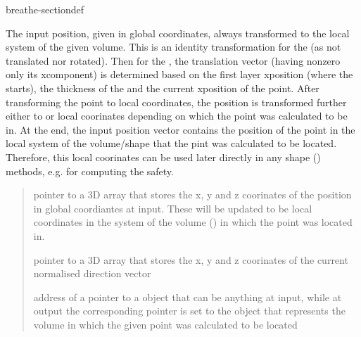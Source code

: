 \documentclass[letterpaper,10pt,english]{sphinxmanual}
\begin{document}
\begin{fulllineitems}
\begin{sphinxuseclass}{breathe-sectiondef}
\begin{fulllineitems}
\begin{itemize}
\end{itemize}


\sphinxAtStartPar
The input position, given in global coordinates, always transformed to the local system of the given volume. This is an identity transformation for the  (as not translated nor rotated). Then for the , the translation vector (having non\sphinxhyphen{}zero only its x\sphinxhyphen{}component) is determined based on the first layer x\sphinxhyphen{}position (where the  starts), the thickness of the  and the current x\sphinxhyphen{}position of the point. After transforming the point to  local coordinates, the position is transformed further either to  or  local coorinates depending on which the point was calculated to be in. At the end, the input position vector contains the position of the point in the local system of the volume/shape that the pint was calculated to be located. Therefore, this local coorinates can be used later directly in any shape ({\hyperref[\detokenize{Simulation/SimulationCodeDoc:class_box}]{}}) methods, e.g. for computing the safety.

\sphinxAtStartPar
\begin{quote}\begin{description}
\sphinxAtStartPar
\sphinxstylestrong{{[}inout{]}} pointer to a 3D array that stores the x, y and z coorinates of the position in global coordiantes at input. These will be updated to be local coordinates in the system of the volume ({\hyperref[\detokenize{Simulation/SimulationCodeDoc:class_box}]{}}) in which the point was located in. 

\sphinxAtStartPar
\sphinxstylestrong{{[}in{]}} pointer to a 3D array that stores the x, y and z coorinates of the current normalised direction vector 

\sphinxAtStartPar
\sphinxstylestrong{{[}inout{]}} address of a pointer to a {\hyperref[\detokenize{Simulation/SimulationCodeDoc:class_box}]{}} object that can be anything at input, while at output the corresponding pointer is set to the  object that represents the volume in which the given point was calculated to be located 


\end{description}
\end{quote}
\end{fulllineitems}
\end{sphinxuseclass}
\end{fulllineitems}
\end{document}
